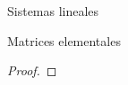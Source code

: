 \documentclass[a4paper,12pt,twoside,spanish]{amsbook}
\theoremstyle{definition}
\theoremstyle{remark}
\begin{document}
\begin{chapter}{Sistemas lineales}
\begin{section}{Matrices elementales}
\begin{proof}
\begin{comment}
				
				\item[(2)] Si la operación elemental es multiplicar la fila $s$ por  $c$ y sumarla a la fila $r$ obtenemos
				\begin{equation*}
				e(I) = \begin{bmatrix} 
				1 & 0 &\cdots &&    0 \\
				& \ddots & &&  \\
				0 &\cdots& 1 &\cdots\; c \;\cdots& 0	\\
				&  & & \ddots &  \\
				0		&  & \cdots& & 1	
				\end{bmatrix}
				\begin{matrix} && \\ && \\ \leftarrow&\text{fila $r$.}& \\ && \\ &&	 		
				\end{matrix} 
				\end{equation*}
				Es decir en la fila $r$ hay un 1 en la posición $r$ y una $c$  en la posición $s$. En símbolos, 
				\begin{equation*}
				e(I)_{ij} = \left\{ \begin{matrix*}[l]
				1& \quad &\text{si $i=j$} \\
				c& \quad &\text{si $i=r$, $j=s$} \\
				0 & \quad &\text{otro caso}
				\end{matrix*}\right..
				\end{equation*}
				
				
				\item[(3)] Si la operación elemental es permutar la fila $r$ por la fila $s$ obtenemos 
				\begin{equation*}
				e(I) = \begin{bmatrix} 1&0& \cdots& &0 \\ &\ddots& & & \\ 0& & c & &0 \\ &&  &\ddots& \\ 0&& \cdots& &1		 		
				\end{bmatrix}.
				\end{equation*}
				
				\begin{equation*}
				e(I)_{ij} = \left\{ \begin{matrix*}[l]
				1& \quad &\text{si $i=j$, $i,j \not= r,s$ } \\
				1& \quad &\text{si $i=r$, $j=s$ o $i=s$, $j=r$} \\
				0 & \quad &\text{otro caso}
				\end{matrix*}\right..
				\end{equation*}
				\end{enumerate}
				\end{comment} 
			\end{proof}
			

\end{section}
\end{chapter}
\end{document}
